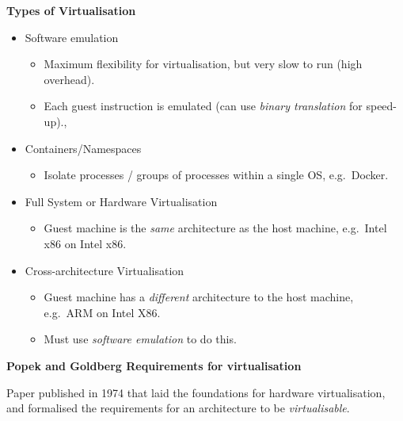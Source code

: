 \documentclass[11pt,a4paper]{article}
\begin{document}
\textbf{Types of Virtualisation}
\begin{itemize}
    \item Software emulation
        \begin{itemize}
            \item Maximum flexibility for virtualisation, but very slow to run (high overhead).
            \item Each guest instruction is emulated (can use \emph{binary translation} for
                speed-up).,
        \end{itemize}
    \item Containers/Namespaces
        \begin{itemize}
            \item Isolate processes / groups of processes within a single OS, e.g.\ Docker.
        \end{itemize}
    \item Full System or Hardware Virtualisation
        \begin{itemize}
            \item Guest machine is the \emph{same} architecture as the host machine,
                e.g.\ Intel x86 on Intel x86.
        \end{itemize}
    \item Cross-architecture Virtualisation
        \begin{itemize}
            \item Guest machine has a \emph{different} architecture to the host machine,
                e.g.\ ARM on Intel X86.
            \item Must use \emph{software emulation} to do this.
        \end{itemize}
\end{itemize}

\textbf{Popek and Goldberg Requirements for virtualisation}

Paper published in 1974 that laid the foundations for hardware virtualisation,
and formalised the requirements for an architecture to be \emph{virtualisable}.
\end{document}
